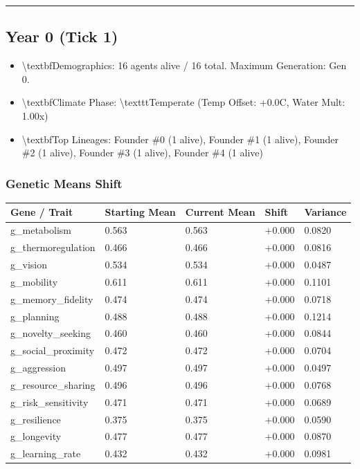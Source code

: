 \documentclass[11pt,a4paper]{article}
\begin{document}
\noindent\rule{\textwidth}{0.4pt}

\subsection*{ Year 0 (Tick 1)}
\begin{itemize}
  \item \textbackslash{}textbf{Demographics:} 16 agents alive / 16 total. Maximum Generation: Gen 0.
  \item \textbackslash{}textbf{Climate Phase:} \textbackslash{}texttt{Temperate} (Temp Offset: +0.0C, Water Mult: 1.00x)
  \item \textbackslash{}textbf{Top Lineages:} Founder \#0 (1 alive), Founder \#1 (1 alive), Founder \#2 (1 alive), Founder \#3 (1 alive), Founder \#4 (1 alive)
\end{itemize}

\subsubsection*{ Genetic Means Shift}
\begin{longtable}{lllll}
\toprule
Gene / Trait & Starting Mean & Current Mean & Shift & Variance \\
\midrule
\endhead
g\_metabolism & 0.563 & 0.563 & +0.000 & 0.0820 \\
g\_thermoregulation & 0.466 & 0.466 & +0.000 & 0.0816 \\
g\_vision & 0.534 & 0.534 & +0.000 & 0.0487 \\
g\_mobility & 0.611 & 0.611 & +0.000 & 0.1101 \\
g\_memory\_fidelity & 0.474 & 0.474 & +0.000 & 0.0718 \\
g\_planning & 0.488 & 0.488 & +0.000 & 0.1214 \\
g\_novelty\_seeking & 0.460 & 0.460 & +0.000 & 0.0844 \\
g\_social\_proximity & 0.472 & 0.472 & +0.000 & 0.0704 \\
g\_aggression & 0.497 & 0.497 & +0.000 & 0.0497 \\
g\_resource\_sharing & 0.496 & 0.496 & +0.000 & 0.0768 \\
g\_risk\_sensitivity & 0.471 & 0.471 & +0.000 & 0.0689 \\
g\_resilience & 0.375 & 0.375 & +0.000 & 0.0590 \\
g\_longevity & 0.477 & 0.477 & +0.000 & 0.0870 \\
g\_learning\_rate & 0.432 & 0.432 & +0.000 & 0.0981 \\
\bottomrule
\end{longtable}
\end{document}
